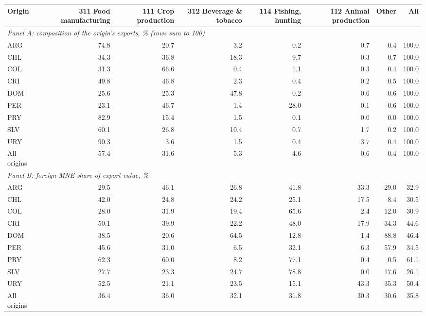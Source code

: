 \begin{tabular}{lrrrrrrr}
\toprule
Origin & 311 Food manufacturing & 111 Crop production & 312 Beverage \& tobacco & 114 Fishing, hunting & 112 Animal production & Other & All \\
\midrule
\multicolumn{8}{l}{\textit{Panel A: composition of the origin's exports, \% (rows sum to 100)}} \\
ARG & 74.8 & 20.7 & 3.2 & 0.2 & 0.7 & 0.4 & 100.0 \\
CHL & 34.3 & 36.8 & 18.3 & 9.7 & 0.3 & 0.7 & 100.0 \\
COL & 31.3 & 66.6 & 0.4 & 1.1 & 0.3 & 0.4 & 100.0 \\
CRI & 49.8 & 46.8 & 2.3 & 0.4 & 0.2 & 0.5 & 100.0 \\
DOM & 25.6 & 25.3 & 47.8 & 0.2 & 0.6 & 0.6 & 100.0 \\
PER & 23.1 & 46.7 & 1.4 & 28.0 & 0.1 & 0.6 & 100.0 \\
PRY & 82.9 & 15.4 & 1.5 & 0.1 & 0.0 & 0.0 & 100.0 \\
SLV & 60.1 & 26.8 & 10.4 & 0.7 & 1.7 & 0.2 & 100.0 \\
URY & 90.3 & 3.6 & 1.5 & 0.4 & 3.7 & 0.4 & 100.0 \\
All origins & 57.4 & 31.6 & 5.3 & 4.6 & 0.6 & 0.4 & 100.0 \\
\midrule
\multicolumn{8}{l}{\textit{Panel B: foreign-MNE share of export value, \%}} \\
ARG & 29.5 & 46.1 & 26.8 & 41.8 & 33.3 & 29.0 & 32.9 \\
CHL & 42.0 & 24.8 & 24.2 & 25.1 & 17.5 & 8.4 & 30.5 \\
COL & 28.0 & 31.9 & 19.4 & 65.6 & 2.4 & 12.0 & 30.9 \\
CRI & 50.1 & 39.9 & 22.2 & 48.0 & 17.9 & 34.3 & 44.6 \\
DOM & 38.5 & 20.6 & 64.5 & 12.8 & 1.4 & 88.8 & 46.4 \\
PER & 45.6 & 31.0 & 6.5 & 32.1 & 6.3 & 57.9 & 34.5 \\
PRY & 62.3 & 60.0 & 8.2 & 77.1 & 0.4 & 0.5 & 61.1 \\
SLV & 27.7 & 23.3 & 24.7 & 78.8 & 0.0 & 17.6 & 26.1 \\
URY & 52.5 & 21.1 & 23.5 & 15.1 & 43.3 & 35.3 & 50.4 \\
All origins & 36.4 & 36.0 & 32.1 & 31.8 & 30.3 & 30.6 & 35.8 \\
\bottomrule
\end{tabular}
